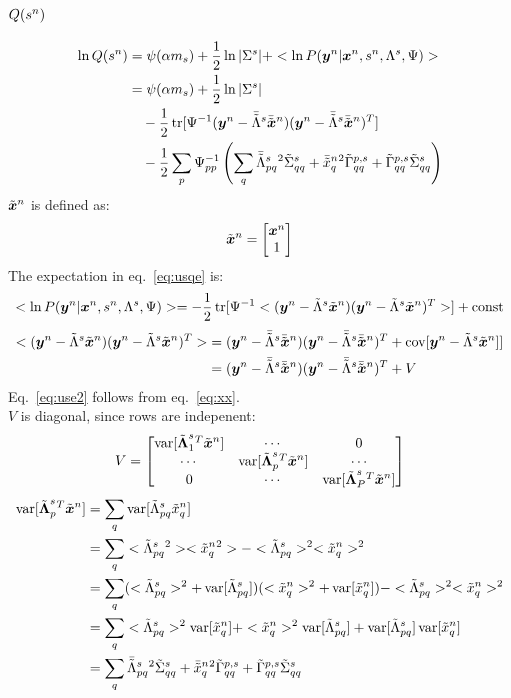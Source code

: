 \documentclass[a4paper]{article}
\begin{document}
\subsection{$Q(\Xs)$}
\begin{align}
  \ln Q(\Xs)
  &=\psi(\alpha m_s)+\frac{1}{2}\ln |\Xxs|+<\ln P(\Xy|\Xx,\Xs,\Xl,\Psi)> \label{eq:usqe} \\
  &=\psi(\alpha m_s)+\frac{1}{2}\ln |\Xxs| \nonumber \\
  &\quad-\frac{1}{2}\Xtr[\Xpsii(\Xy-\Xltm\Xxtm)(\Xy-\Xltm\Xxtm)^T] \nonumber \\
  &\quad-\frac{1}{2}\sum_p\Xpsii_{pp}\left(\sum_q\Xltmpq{}^2\Xxtv_{qq}+\Xxtmq{}^2\Xltvp_{qq}+\Xltvp_{qq}\Xxtv_{qq}\right)
\end{align}
$\Xxt$ is defined as:
\begin{align}
  \Xxt=
  \begin{bmatrix}
    \Xx \\
    1
  \end{bmatrix}
\end{align}
The expectation in eq.~\ref{eq:usqe} is:
\begin{align}
  <\ln P(\Xy|\Xx,\Xs,\Xl,\Psi)>=-\frac{1}{2}\Xtr[\Xpsii<(\Xy-\Xlt\Xxt)(\Xy-\Xlt\Xxt)^T>]+\text{const} \label{eq:usle}
\end{align}
\begin{align}
  <(\Xy-\Xlt\Xxt)(\Xy-\Xlt\Xxt)^T>
  &=(\Xy-\Xltm\Xxtm)(\Xy-\Xltm\Xxtm)^T+\Xcov[\Xy-\Xlt\Xxt]] \label{eq:use2} \\
  &=(\Xy-\Xltm\Xxtm)(\Xy-\Xltm\Xxtm)^T+V \label{eq:use}
\end{align}
Eq.~\ref{eq:use2} follows from eq.~\ref{eq:xx}. \\
$V$ is diagonal, since rows are indepenent:
\begin{align}
  V=
  \begin{bmatrix}
    \Xvar[\Xltb_1{}^T\Xxt] & \cdots & 0 \\
    \cdots & \Xvar[\Xltb_p{}^T\Xxt] & \cdots \\
    0   & \cdots & \Xvar[\Xltb_P{}^T\Xxt]
  \end{bmatrix}
\end{align}
\begin{align}
  \Xvar[\Xltp{}^T\Xxt]
  &=\sum_q\Xvar[\Xltpq\Xxtq] \\
  &=\sum_q<\Xltpq{}^2><\Xxtq{}^2>-<\Xltpq>^2<\Xxtq>^2 \label{eq:usv1} \\
  &=\sum_q(<\Xltpq>^2+\Xvar[\Xltpq])(<\Xxtq>^2+\Xvar[\Xxtq])-<\Xltpq>^2<\Xxtq>^2 \label{eq:usv2} \\
  &=\sum_q<\Xltpq>^2\Xvar[\Xxtq]+<\Xxtq>^2\Xvar[\Xltpq]+\Xvar[\Xltpq]\Xvar[\Xxtq] \\
  &=\sum_q\Xltmpq{}^2\Xxtv_{qq}+\Xxtmq{}^2\Xltvp_{qq}+\Xltvp_{qq}\Xxtv_{qq}
\end{align}
\end{document}

